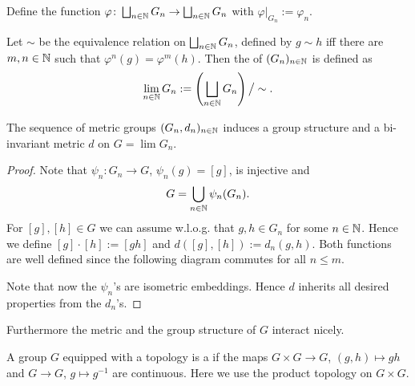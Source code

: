 Define the function $\varphi\colon\bigsqcup_{n\in\mathbb{N}} G_n\to\bigsqcup_{n\in\mathbb{N}} G_n$ with $\varphi|_{G_n}:=\varphi_n$.
\begin{definition}
Let $\sim$ be the equivalence relation on $\bigsqcup_{n\in\mathbb{N}} G_n$, defined by $g\sim h$ iff there are $m,n\in\mathbb{N}$ such that $\varphi^n(g)=\varphi^m(h)$.
Then the  of $(G_n)_{n\in\mathbb{N}}$ is defined as
\[\lim_{n\in\mathbb{N}} G_n:=\left(\bigsqcup_{n\in\mathbb{N}} G_n\right)\big/\sim.\]
\end{definition}
\begin{lemma}
The sequence of metric groups $(G_n,d_n)_{n\in\mathbb{N}}$ induces a group structure and a bi-invariant metric $d$ on $G=\lim G_n$. 
\end{lemma}
\begin{proof}
Note that $\psi_n\colon G_n\to G$, $\psi_n(g)=[g]$, is injective and \[G=\bigcup_{n\in\mathbb{N}}\psi_n(G_n).\]
For $[g], [h]\in G$ we can assume w.l.o.g. that $g,h\in G_n$ for some $n\in\mathbb{N}$. Hence we define $[g]\cdot[h]:=[gh]$ and $d([g],[h]):=d_n(g,h)$. Both functions are well defined since the following diagram commutes for all $n\leq m$.
\begin{center}
\end{center}
Note that now the $\psi_n$'s are isometric embeddings. Hence $d$ inherits all desired properties from the $d_n$'s. 
\end{proof}

Furthermore the metric and the group structure of $G$ interact nicely.
\begin{definition}
A group $G$ equipped with a topology is a  if 
the maps $G\times G\to G$, $(g,h)\mapsto gh$ and
 $G\to G$, $g\mapsto g^{-1}$ are continuous. Here we use the product topology on $G\times G$.
\end{definition}

